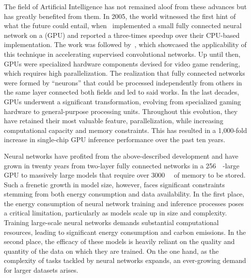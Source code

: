 The field of Artificial Intelligence has not remained aloof from these advances but has greatly benefited from them. In 2005, the world witnessed the first hint of what the future could entail, when~ implemented a small fully connected neural network on a  (GPU) and reported a three-times speedup over their CPU-based implementation. The work was followed by~, which showcased the applicability of this technique in accelerating supervised convolutional networks. Up until then, GPUs were specialized hardware components devised for video game rendering, which requires high parallelization. The realization that fully connected networks were formed by ``neurons'' that could be processed independently from others in the same layer connected both fields and led to said works. In the last decades, GPUs underwent a significant transformation, evolving from specialized gaming hardware to general-purpose processing units. Throughout this evolution, they have retained their most valuable feature, parallelization, while increasing computational capacity and memory constraints. This has resulted in a 1,000-fold increase in single-chip GPU inference performance over the past ten years.


Neural networks have profited from the above-described development and have grown in twenty years from two-layer fully connected networks in a \qty{256}{\mega\byte}-large GPU to massively large models that require over \qty{3000}{\giga\byte} of memory to be stored. Such a frenetic growth in model size, however, faces significant constraints stemming from both energy consumption and data availability. In the first place, the energy consumption of neural network training and inference processes poses a critical limitation, particularly as models scale up in size and complexity. Training large-scale neural networks demands substantial computational resources, leading to significant energy consumption and carbon emissions. In the second place, the efficacy of these models is heavily reliant on the quality and quantity of the data on which they are trained. On the one hand, as the complexity of tasks tackled by neural networks expands, an ever-growing demand for larger datasets arises.

